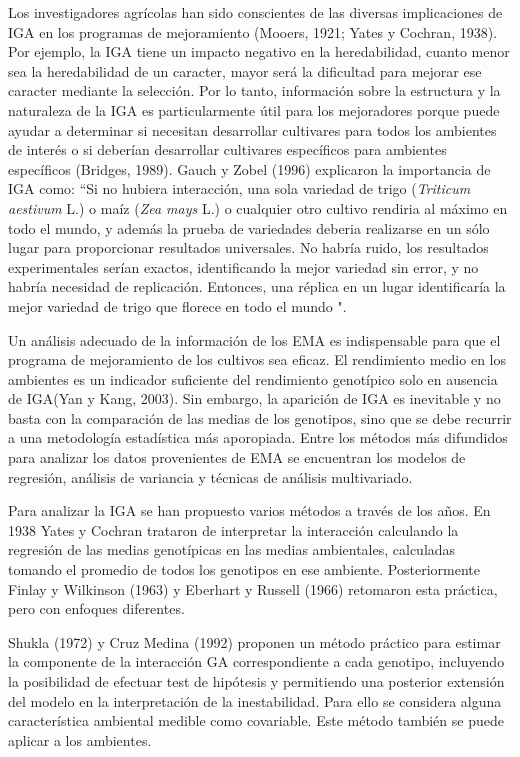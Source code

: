 Los investigadores agrícolas han sido conscientes de las diversas implicaciones de IGA en los programas de mejoramiento (Mooers, 1921; Yates y Cochran, 1938). Por ejemplo, la IGA tiene un impacto negativo en la heredabilidad, cuanto menor sea la heredabilidad de un caracter, mayor será la dificultad para mejorar ese caracter mediante la selección.
Por lo tanto, información sobre la estructura y la naturaleza de la IGA es particularmente útil para los mejoradores porque puede ayudar a determinar si necesitan desarrollar cultivares para todos los ambientes de interés o si deberían desarrollar cultivares específicos para ambientes específicos (Bridges, 1989). Gauch y Zobel (1996) explicaron la importancia de IGA como: “Si no hubiera interacción, una sola variedad de trigo (\emph{Triticum aestivum} L.) o maíz (\emph{Zea mays} L.) o cualquier otro cultivo rendiria al máximo en todo el mundo, y además la prueba de variedades deberia realizarse en un sólo lugar para proporcionar resultados universales. No habría ruido, los resultados experimentales serían exactos, identificando la mejor variedad sin error, y no habría necesidad de replicación. Entonces, una réplica en un lugar identificaría la mejor variedad de trigo que florece en todo el mundo ".


Un análisis adecuado de la información de los EMA es indispensable para que el programa de mejoramiento de los cultivos sea eficaz. El rendimiento medio en los ambientes es un indicador suficiente del rendimiento genotípico solo en ausencia de IGA(Yan y Kang, 2003). Sin embargo, la aparición de IGA es inevitable y no basta con la comparación de las medias de los genotipos, sino que se debe recurrir a una metodología estadística más aporopiada. Entre los métodos más difundidos para analizar los datos provenientes de EMA se encuentran los modelos de regresión, análisis de variancia y técnicas de análisis multivariado. 

Para analizar la IGA se han propuesto varios métodos a través de los años. En 1938 Yates y Cochran trataron de interpretar la interacción calculando la regresión de las medias genotípicas en las medias ambientales, calculadas tomando el promedio de todos los genotipos en ese ambiente. Posteriormente Finlay y Wilkinson (1963) y Eberhart y Russell (1966) retomaron esta práctica, pero con enfoques diferentes.

Shukla (1972) y Cruz Medina (1992) proponen un método práctico para estimar la componente de la interacción GA correspondiente a cada genotipo, incluyendo la posibilidad de efectuar test de hipótesis y permitiendo una posterior extensión del modelo en la interpretación de la inestabilidad. Para ello se considera alguna característica ambiental medible como covariable. Este método también se puede aplicar a los ambientes.

